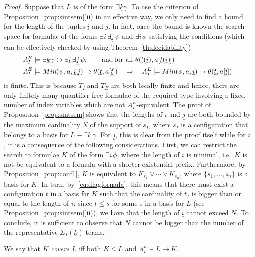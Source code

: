 \documentclass{LMCS}
\newcommand{\ui}{\ensuremath{\underline i}}
\newcommand{\uj}{\ensuremath{\underline j}}
\newcommand{\uk}{\ensuremath{\underline k}}
\newcommand{\ut}{\ensuremath{\underline t}}
\theoremstyle{plain}\newtheorem{assumption}[thm]{Assumption}
\theoremstyle{plain}\newtheorem{proposition}[thm]{Proposition}
\theoremstyle{plain}\newtheorem{property}[thm]{Property}
\theoremstyle{plain}\newtheorem{example}[thm]{Example}
\theoremstyle{plain}\newtheorem{claim}[thm]{Claim}
\theoremstyle{plain}\newtheorem{lemma}[thm]{Lemma}
\begin{document}
\begin{proof}
  Suppose that $L$ is of the form $\exists \uk \gamma$.  To use the
  criterion of Proposition~\ref{prop:sintsem}(ii) in an effective way,
  we only need to find a bound for the length of the tuples $\ui$ and
  $\uj$. In fact, once the bound is known the search space for
  formulae of the forms $\exists\ui \,\exists\uj \, \psi$ and $\exists
  \ui \, \phi$ satisfying the conditions (which can be effectively
  checked by using Theorem~\ref{th:decidability})
  \begin{eqnarray*}
    & A^E_I\models \exists \uk \gamma\leftrightarrow \exists\ui
    \,\exists\uj \, \psi, \qquad {\rm and~for~all}~\theta(\ut(\ui),
    a[\ut(\ui)])~~~~~~~~~~~~~~~~~~~~~~~~~ \\ &
    A^E_I\models Min(\psi,a, \ui\,\uj)\to \theta(\ut, a[\ut])\quad
    \Rightarrow \quad A^E_I\models Min(\phi,a,\ui)\to \theta(\ut,
    a[\ut])
  \end{eqnarray*}
  is finite.  This is because $T_I$ and $T_E$ are both locally finite
  and hence, there are only finitely many quantifier-free formulae of
  the required type involving a fixed number of index variables which
  are not $A^E_I$-equivalent. The proof of
  Proposition~\ref{prop:sintsem} shows that the lengths of $\ui$ and
  $\uj$ are both bounded by the maximum cardinality $N$ of the support
  of $s_I$, where $s_I$ is a configuration that belongs to a basis for
  $L\equiv\exists\uk \, \gamma$.  For $\uj$, this is clear from the
  proof itself while for $\ui$, it is a consequence of the following
  considerations.  First, we can restrict the search to formulae $K$
  of the form $\exists \ui \, \phi$, where the length of $\ui$ is
  minimal, i.e.\ $K$ is not be equivalent to a formula with a shorter
  existential prefix.  Furthermore, by Proposition~\ref{prop:conf1},
  $K$ is equivalent to $K_{s_1}\vee \cdots \vee K_{s_n}$, where $\{
  s_1, \dots, s_n\}$ is a basis for $K$.  In turn,
  by~\eqref{eq:diagformula}, this means that there must exist a
  configuration $t$ in a basis for ${K}$ such that the cardinality of
  $t_I$ is bigger than or equal to the length of $\ui$; since $t\leq
  s$ for some $s$ in a basis for $L$ (see
  Proposition~\ref{prop:sintsem}(ii)), we have that the length of
  $\ui$ cannot exceed $N$.  To conclude, it is sufficient to observe
  that $N$ cannot be bigger than the number of the representative
  $\Sigma_I(\uk)$-terms.
\end{proof}
\begin{defi}
  We say that \emph{$K$ covers $L$} iff both $K\leq L$ and
  $A^E_I\models L\to K$.
\end{defi}
\end{document}
